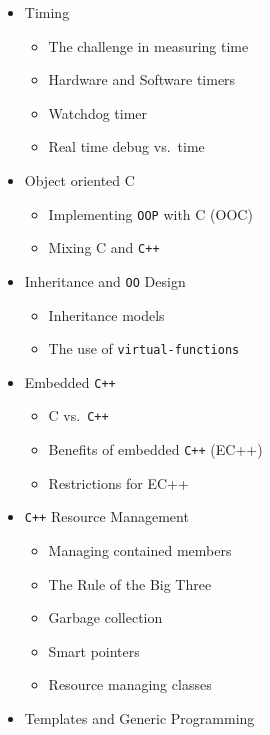 \documentclass[
]{article}
\providecommand{\tightlist}{%
  \setlength{\itemsep}{0pt}\setlength{\parskip}{0pt}}
\begin{document}
\begin{itemize}
  \begin{itemize}
  \tightlist
  \item
    Interrupts - handlers and dispatchers
  \item
    Hardware and Software interrupts
  \item
    Contexts
  \end{itemize}
\item
  Timing

  \begin{itemize}
  \tightlist
  \item
    The challenge in measuring time
  \item
    Hardware and Software timers
  \item
    Watchdog timer
  \item
    Real time debug vs.~time
  \end{itemize}
\item
  Object oriented C

  \begin{itemize}
  \tightlist
  \item
    Implementing \texttt{OOP} with C (OOC)
  \item
    Mixing C and \texttt{C++}
  \end{itemize}
\item
  Inheritance and \texttt{OO} Design

  \begin{itemize}
  \tightlist
  \item
    Inheritance models
  \item
    The use of \texttt{virtual-functions}
  \end{itemize}
\item
  Embedded \texttt{C++}

  \begin{itemize}
  \tightlist
  \item
    C vs.~\texttt{C++}
  \item
    Benefits of embedded \texttt{C++} (EC++)
  \item
    Restrictions for EC++
  \end{itemize}
\item
  \texttt{C++} Resource Management

  \begin{itemize}
  \tightlist
  \item
    Managing contained members
  \item
    The Rule of the Big Three
  \item
    Garbage collection
  \item
    Smart pointers
  \item
    Resource managing classes
  \end{itemize}
\item
  Templates and Generic Programming


\end{itemize}
\end{document}
